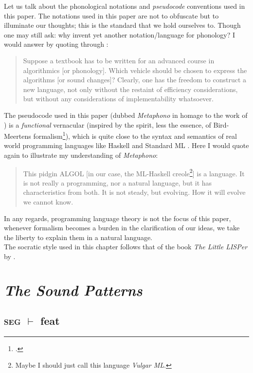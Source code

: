 \documentclass{report}[12pt]
\begin{document}
Let us talk about the phonological notations and \emph{pseudocode} conventions used in this paper. The notations used in this paper are not to obfuscate but to illuminate our thoughts; this is the standard that we hold ourselves to. Though one may still ask: why invent yet another notation/language for phonology? I would answer by quoting \cite{abstracto} through \cite[p.~14]{squiggol}:
\begin{quote}
  Suppose a textbook has to be written for an advanced course in algorithmics [or phonology]. Which vehicle should be chosen to express the algorithms [or sound changes]? Clearly, one has the freedom to construct a new language, not only without the restaint of efficiency considerations, but without any considerations of implementability whatsoever.
\end{quote}
The pseudocode used in this paper (dubbed \emph{Metaphono} in homage to the work of \cite{hartman_phono}) is a \emph{functional} vernacular (inspired by the spirit, less the essence, of Bird-Meertens formalism\footcite{bird_moor, squiggol, bird_meertens_book}), which is quite close to the syntax and semantics of real world programming languages like Haskell \parencite{haskell2010} and Standard ML \parencite{def_sml}. Here I would quote \cite[p.~57]{abstracto} again to illustrate my understanding of \emph{Metaphono}:
\begin{quote}
  This pidgin ALGOL [in our case, the ML-Haskell creole\footnote{Maybe I should just call this language \emph{Vulgar ML}.}] is a language. It is not really a programming, nor a natural language, but it has characteristics from both. It is not steady, but evolving. How it will evolve we cannot know.
\end{quote}
In any regards, programming language theory is not the focus of this paper, whenever formalism becomes a burden in the clarification of our ideas, we take the liberty to explain them in a natural language. \\
The socratic style used in this chapter follows that of the book \emph{The Little LISPer} by \cite{lisper}.

\section{\emph{The Sound Patterns}}\label{sec:sound_patterns}

\subsection*{\textsc{seg} $\vdash$ feat}
\end{document}
